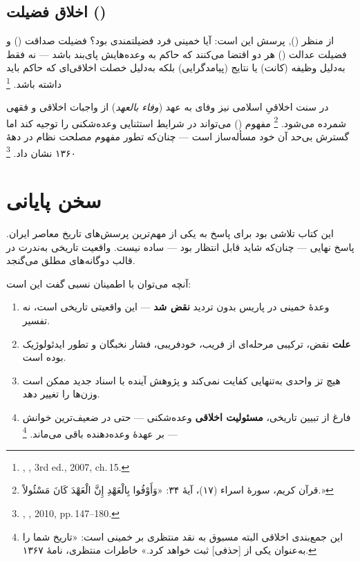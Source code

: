 \subsection{اخلاق فضیلت ()}

از منظر 
(),
پرسش این است: آیا خمینی فرد فضیلتمندی بود؟
فضیلت صداقت ()
و فضیلت عدالت ()
هر دو اقتضا می‌کنند که حاکم به وعده‌هایش پای‌بند باشد —
نه فقط به‌دلیل وظیفه (کانت)
یا نتایج (پیامدگرایی)
بلکه به‌دلیل خصلت اخلاقی‌ای که حاکم باید داشته باشد.%
\footnote{%
,
\textit{}, 3rd ed., 2007, ch.\,15.}

\begin{noteBox}
در سنت اخلاقیِ اسلامی نیز
وفای به عهد (\textit{وفاء بالعهد})
از واجبات اخلاقی و فقهی شمرده می‌شود.%
\footnote{قرآن کریم، سورهٔ اسراء (۱۷)، آیهٔ ۳۴:
«وَأَوْفُوا بِالْعَهْدِ إِنَّ الْعَهْدَ كَانَ مَسْئُولاً.»}
مفهوم 
()
می‌تواند در شرایط استثنایی وعده‌شکنی را توجیه کند
اما گسترش بی‌حد آن خود مسأله‌ساز است —
چنان‌که تطور مفهوم مصلحت نظام در دههٔ ۱۳۶۰ نشان داد.%
\footnote{%
,
\textit{}, 2010, pp.\,147–180.}
\end{noteBox}

\section{سخن پایانی}
\label{sec:ch16-final-word}

این کتاب تلاشی بود برای پاسخ به یکی از
مهم‌ترین پرسش‌های تاریخ معاصر ایران.
پاسخ نهایی — چنان‌که شاید قابل انتظار بود —
ساده نیست.
واقعیت تاریخی به‌ندرت در قالب دوگانه‌های مطلق می‌گنجد.

آنچه می‌توان با اطمینان نسبی گفت این است:

\begin{enumerate}
\item وعدهٔ خمینی در پاریس بدون تردید \textbf{نقض شد} —
  این واقعیتی تاریخی است، نه تفسیر.
\item \textbf{علت} نقض، ترکیبی مرحله‌ای از فریب،
  خودفریبی، فشار نخبگان و تطور ایدئولوژیک بوده است.
\item هیچ تز واحدی به‌تنهایی کفایت نمی‌کند
  و پژوهش آینده با اسناد جدید ممکن است
  وزن‌ها را تغییر دهد.
\item فارغ از تبیین تاریخی،
  \textbf{مسئولیت اخلاقی} وعده‌شکنی — حتی در ضعیف‌ترین خوانش —
  بر عهدهٔ وعده‌دهنده باقی می‌ماند.%
  \footnote{%
  این جمع‌بندی اخلاقی البته مسبوق به
  نقد منتظری بر خمینی است:
  «تاریخ شما را به‌عنوان یکی از [حذفی] ثبت خواهد کرد.»
  خاطرات منتظری، نامهٔ ۱۳۶۷.}
\end{enumerate}

